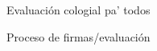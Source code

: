 \documentclass[main.tex]{subfiles}
\begin{document}
	
\section{}

Evaluación cologial pa' todos

Proceso de firmas/evaluación
\end{document}
